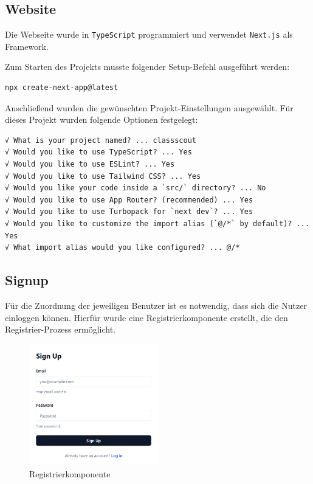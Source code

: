 \begin{inhalt}
\renewcommand*\chapterpagestyle{scrheadings}
\chapter{Website}

Die Webseite wurde in \texttt{TypeScript} programmiert und verwendet \texttt{Next.js} als Framework.

\vspace{0.15cm}

Zum Starten des Projekts musste folgender Setup-Befehl ausgeführt werden:

\begin{lstlisting}[style=myconsole]
npx create-next-app@latest
\end{lstlisting}

Anschließend wurden die gewünschten Projekt-Einstellungen ausgewählt.  
Für dieses Projekt wurden folgende Optionen festgelegt:

\begin{lstlisting}[style=myconsole]
√ What is your project named? ... classscout
√ Would you like to use TypeScript? ... Yes
√ Would you like to use ESLint? ... Yes
√ Would you like to use Tailwind CSS? ... Yes
√ Would you like your code inside a `src/` directory? ... No
√ Would you like to use App Router? (recommended) ... Yes
√ Would you like to use Turbopack for `next dev`? ... Yes
√ Would you like to customize the import alias (`@/*` by default)? ... Yes
√ What import alias would you like configured? ... @/*
\end{lstlisting}



\newpage

\section{Signup}
\label{ref:Signup}
Für die Zuordnung der jeweiligen Benutzer ist es notwendig, dass sich die Nutzer einloggen können.  
Hierfür wurde eine Registrierkomponente erstellt, die den Registrier-Prozess ermöglicht.


\begin{figure}[!htb]
\centering
\includegraphics[width=0.5\textwidth]{files/Thomas/pics/Website/Signup/sign-up.png}
\caption[Bildbezeichnung für Abbildungsverzeichnis]{Registrierkomponente}
\label{fig:gehaeuse_internet_bild}
\end{figure}


\end{inhalt}
